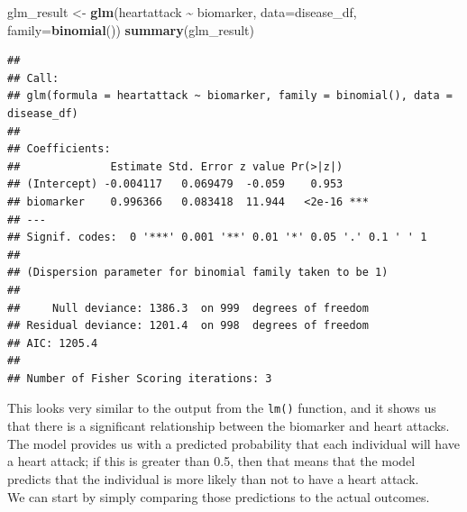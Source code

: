 \documentclass[
  12pt,
]{book}
\newenvironment{Shaded}{\begin{snugshade}}{\end{snugshade}}
\newcommand{\AttributeTok}[1]{\textcolor[rgb]{0.13,0.29,0.53}{#1}}
\newcommand{\CommentTok}[1]{\textcolor[rgb]{0.56,0.35,0.01}{\textit{#1}}}
\newcommand{\ConstantTok}[1]{\textcolor[rgb]{0.56,0.35,0.01}{#1}}
\newcommand{\FloatTok}[1]{\textcolor[rgb]{0.00,0.00,0.81}{#1}}
\newcommand{\FunctionTok}[1]{\textcolor[rgb]{0.13,0.29,0.53}{\textbf{#1}}}
\newcommand{\NormalTok}[1]{#1}
\newcommand{\OtherTok}[1]{\textcolor[rgb]{0.56,0.35,0.01}{#1}}
\newcommand{\SpecialCharTok}[1]{\textcolor[rgb]{0.81,0.36,0.00}{\textbf{#1}}}
\begin{document}
\begin{Shaded}
\begin{Highlighting}[]
\NormalTok{glm\_result }\OtherTok{\textless{}{-}} \FunctionTok{glm}\NormalTok{(heartattack }\SpecialCharTok{\textasciitilde{}}\NormalTok{ biomarker, }\AttributeTok{data=}\NormalTok{disease\_df,}
                  \AttributeTok{family=}\FunctionTok{binomial}\NormalTok{())}
\FunctionTok{summary}\NormalTok{(glm\_result)}
\end{Highlighting}
\end{Shaded}

\begin{verbatim}
## 
## Call:
## glm(formula = heartattack ~ biomarker, family = binomial(), data = disease_df)
## 
## Coefficients:
##              Estimate Std. Error z value Pr(>|z|)    
## (Intercept) -0.004117   0.069479  -0.059    0.953    
## biomarker    0.996366   0.083418  11.944   <2e-16 ***
## ---
## Signif. codes:  0 '***' 0.001 '**' 0.01 '*' 0.05 '.' 0.1 ' ' 1
## 
## (Dispersion parameter for binomial family taken to be 1)
## 
##     Null deviance: 1386.3  on 999  degrees of freedom
## Residual deviance: 1201.4  on 998  degrees of freedom
## AIC: 1205.4
## 
## Number of Fisher Scoring iterations: 3
\end{verbatim}

This looks very similar to the output from the \texttt{lm()} function, and it shows us that there is a significant relationship between the biomarker and heart attacks. The model provides us with a predicted probability that each individual will have a heart attack; if this is greater than 0.5, then that means that the model predicts that the individual is more likely than not to have a heart attack.\\
We can start by simply comparing those predictions to the actual outcomes.

\begin{Shaded}
\end{Shaded}
\end{document}
